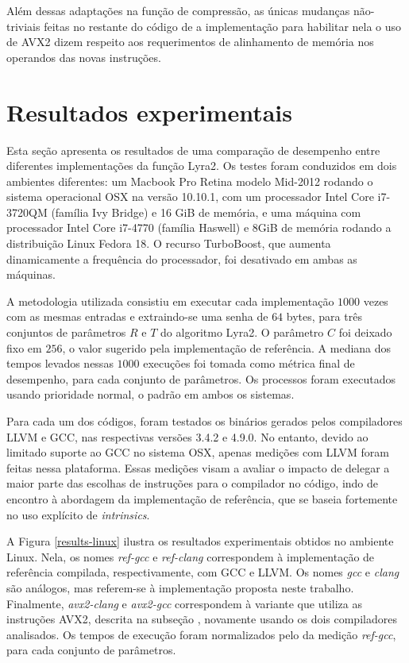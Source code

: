 \documentclass{article}
\begin{document}
Além dessas adaptações na função de compressão, as únicas mudanças
não-triviais feitas no restante do código de a implementação para
habilitar nela o uso de AVX2 dizem respeito aos requerimentos de
alinhamento de memória nos operandos das novas instruções.

\section{Resultados experimentais }
\label{sec-experimental}

Esta seção apresenta os resultados de uma comparação de desempenho entre
diferentes implementações da função Lyra2. Os testes foram conduzidos em
dois ambientes diferentes: um Macbook Pro Retina modelo Mid-2012 rodando
o sistema operacional OSX na versão 10.10.1, com um processador Intel
Core i7-3720QM (família Ivy Bridge) e 16 GiB de memória, e uma máquina
com processador Intel Core i7-4770 (família Haswell) e 8GiB de memória
rodando a distribuição Linux Fedora 18. O recurso TurboBoost, que
aumenta dinamicamente a frequência do processador, foi desativado em
ambas as máquinas.

A metodologia utilizada consistiu em executar cada implementação
$1000$ vezes com as mesmas entradas e extraindo-se uma senha de $64$
bytes, para três conjuntos de parâmetros $R$ e $T$ do algoritmo
Lyra2. O parâmetro $C$ foi deixado fixo em $256$, o valor sugerido
pela implementação de referência. A mediana dos tempos levados nessas
$1000$ execuções foi tomada como métrica final de desempenho, para
cada conjunto de parâmetros. Os processos foram executados usando
prioridade normal, o padrão em ambos os sistemas.

Para cada um dos códigos, foram testados os binários gerados pelos
compiladores LLVM e GCC, nas respectivas versões 3.4.2 e 4.9.0. No
entanto, devido ao limitado suporte ao GCC no sistema OSX, apenas
medições com LLVM foram feitas nessa plataforma. Essas medições visam a
avaliar o impacto de delegar a maior parte das escolhas de instruções
para o compilador no código, indo de encontro à abordagem da
implementação de referência, que se baseia fortemente no uso explícito
de \emph{intrinsics}.

A Figura \ref{results-linux} ilustra os resultados experimentais obtidos
no ambiente Linux. Nela, os nomes \emph{ref-gcc} e \emph{ref-clang}
correspondem à implementação de referência compilada, respectivamente,
com GCC e LLVM. Os nomes \emph{gcc} e \emph{clang} são análogos, mas
referem-se à implementação proposta neste trabalho. Finalmente,
\emph{avx2-clang} e \emph{avx2-gcc} correspondem à variante que utiliza
as instruções AVX2, descrita na subseção \cite{avx2}, novamente usando os
dois compiladores analisados. Os tempos de execução foram normalizados
pelo da medição \emph{ref-gcc}, para cada conjunto de parâmetros.
\end{document}
